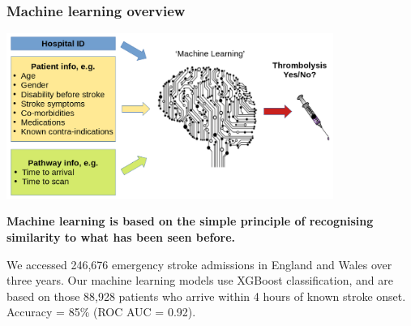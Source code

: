 \begin{frame}
\frametitle{Machine learning overview}
\begin{center}
\includegraphics[width=0.80\textwidth]{./images/ml_model_high_level}
\end{center}

\small
\textbf{Machine learning is based on the simple principle of recognising similarity to what has been seen before.}
\vspace{2mm}

\footnotesize{We accessed 246,676 emergency stroke admissions in England and Wales over three years. Our machine learning models use XGBoost classification, and are based on those 88,928 patients who arrive within 4 hours of known stroke onset. Accuracy = 85\% (ROC AUC = 0.92).}
\end{frame}